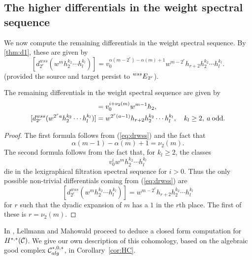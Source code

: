 \subsection*{The higher differentials in the weight spectral sequence}

We now compute the remaining differentials in the weight spectral sequence.  By \ref{thm:d1}, these are given by
\begin{equation}\label{eq:drwss} [d_{2^r}^{wss} (w^m h_2^{k_2} \cdots h_l^{k_l})] = v_0^{\alpha(m-2^r)-\alpha(m)+1} w^{m-2^r}h_{r+2} h_2^{k_2} \cdots h_l^{k_l}.
\end{equation}
(provided the source and target persist to $\prescript{wss}{}{E}_{2^r}$).

\begin{prop}\label{prop:drwss}
The remaining differentials in the weight spectral sequence are given by
\begin{align*}
[d_{1}^{wss}(v_0^iw^{m})] & = v_0^{i+\nu_2(m)}w^{m-1} h_2, \\
[d_{2^r}^{wss}(w^{2^r a}h_2^{k_2} \cdots h_l^{k_l})] & = w^{2^r(a-1)} h_{r+2} h_2^{k_2} \cdots h_l^{k_l}, \quad k_l \ge 2, \: a \: \mr{odd}. 
\end{align*}
\end{prop}

\begin{proof}
The first formula follows from (\ref{eq:drwss}) and the fact that 
$$ \alpha(m-1) - \alpha(m)+1 = \nu_2(m). $$
The second formula follows from the fact that, for $k_l \ge 2$, the classes
$$ v_0^i w^m h_2^{k_2} \cdots h_l^{k_l} $$
die in the lexigraphical filtration spectral sequence for $i > 0$.  Thus the only possible non-trivial differentials coming from (\ref{eq:drwss}) are
$$ [d_{2^r}^{wss} (w^m h_2^{k_2} \cdots h_l^{k_l})] = w^{m-2^r}h_{r+2} h_2^{k_2} \cdots h_l^{k_l} $$
for $r$ such that the dyadic expansion of $m$ has a $1$ in the $r$th place.  The first of these is $r = \nu_2(m)$.
\end{proof}

In \cite{LM}, Lellmann and Mahowald proceed to deduce a closed form computation for $H^{*,*}(\mathcal{C})$.  We give our own description of this cohomology, based on the algebraic good complex $\mathcal{C}^{*,0,*}_{alg}$, in Corollary~\ref{cor:HC}. 





